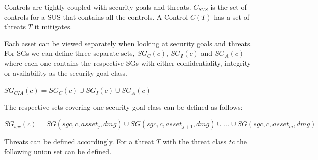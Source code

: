 Controls are tightly coupled with security goals and threats. $C_{SUS}$ is the set of controls for a SUS that contains all the controls. A Control $C(T)$ has a set of threats $T$ it mitigates.

Each asset can be viewed separately when looking at security goals and threats. For SGs we can define three separate sets, $SG_C(c)$, $SG_I(c)$ and $SG_A(c)$ where each one contains the respective SGs with either confidentiality, integrity or availability as the security goal class.

\begin{theorem}
$SG_{CIA}(c) = SG_C(c) \cup SG_I(c) \cup SG_A(c)$
\end{theorem}

The respective sets covering one security goal class can be defined as follows:

\begin{theorem}
$SG_{sgc}(c) = SG(sgc, c, asset_j, dmg) \cup SG(sgc, c, asset_{j+1}, dmg)  \cup ... \cup SG(sgc, c, asset_m, dmg) $
\end{theorem}

%
% 
%
%
%

Threats can be defined accordingly. For a threat $T$ with the threat class $tc$ the following union set can be defined. 

